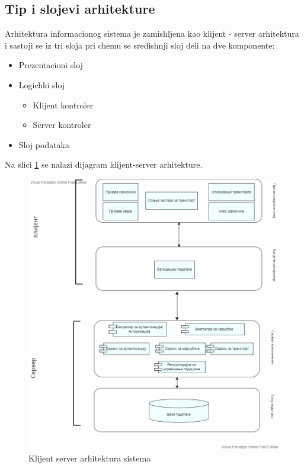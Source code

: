 \subsection{Tip i slojevi arhitekture}
Arhitektura informacionog sistema je zamishljena kao klijent - server arhitektura i
sastoji se iz tri sloja pri chemu se sredishnji sloj deli na dve komponente: 
\begin{itemize}
    \item  Prezentacioni sloj
\item Logichki sloj
\begin{itemize}
    \item Klijent kontroler
    \item Server kontroler
\end{itemize}

\item Sloj podataka

\end{itemize}
Na slici \ref{fig:klijent-server} se nalazi dijagram klijent-server arhitekture.


\begin{figure}[H]
    \centering
    \includegraphics[width=12cm]{Slike/Arhitektura/predlogArhitekture.jpg}
    \caption{Klijent server arhitektura sistema}
    \label{fig:klijent-server}
\end{figure}

